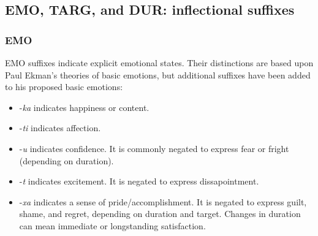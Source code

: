 	\subsection{EMO, TARG, and DUR: inflectional suffixes}
		\subsubsection{EMO}
			EMO suffixes indicate explicit emotional states. Their distinctions are based upon Paul Ekman's theories of basic emotions, but additional suffixes have been added to his proposed basic emotions:
				\begin{itemize}
					\item -\emph{ka} indicates happiness or content.
					\item -\emph{ti} indicates affection.
					\item -\emph{\W u} indicates confidence. It is commonly negated to express fear or fright (depending on duration).
					\item -\emph{t\OO} indicates excitement. It is negated to express dissapointment.
					\item -\emph{xa} indicates a sense of pride/accomplishment. It is negated to express guilt, shame, and regret, depending on duration and target. Changes in duration can mean immediate or longstanding satisfaction.
				\end{itemize}

